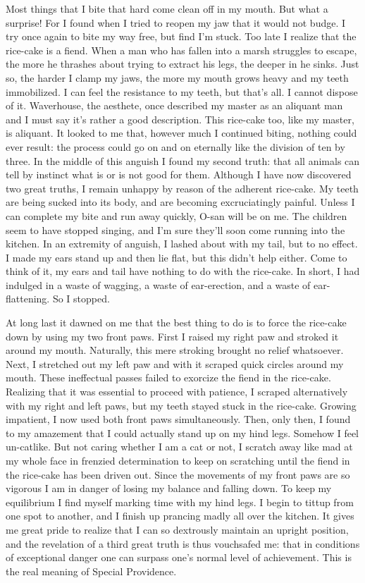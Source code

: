\documentclass{book}
\begin{document}
Most things that I bite that hard come clean off in my mouth. But what a
surprise! For I found when I tried to reopen my jaw that it would not
budge. I try once again to bite my way free, but find I'm stuck. Too
late I realize that the rice-cake is a fiend. When a man who has fallen
into a marsh struggles to escape, the more he thrashes about trying to
extract his legs, the deeper in he sinks. Just so, the harder I clamp my
jaws, the more my mouth grows heavy and my teeth immobilized. I can feel
the resistance to my teeth, but that's all. I cannot dispose of it.
Waverhouse, the aesthete, once described my master as an aliquant man
and I must say it's rather a good description. This rice-cake too, like
my master, is aliquant. It looked to me that, however much I continued
biting, nothing could ever result: the process could go on and on
eternally like the division of ten by three. In the middle of this
anguish I found my second truth: that all animals can tell by instinct
what is or is not good for them. Although I have now discovered two
great truths, I remain unhappy by reason of the adherent rice-cake. My
teeth are being sucked into its body, and are becoming excruciatingly
painful. Unless I can complete my bite and run away quickly, O-san will
be on me. The children seem to have stopped singing, and I'm sure
they'll soon come running into the kitchen. In an extremity of anguish,
I lashed about with my tail, but to no effect. I made my ears stand up
and then lie flat, but this didn't help either. Come to think of it, my
ears and tail have nothing to do with the rice-cake. In short, I had
indulged in a waste of wagging, a waste of ear-erection, and a waste of
ear-flattening. So I stopped.

At long last it dawned on me that the best thing to do is to force the
rice-cake down by using my two front paws. First I raised my right paw
and stroked it around my mouth. Naturally, this mere stroking brought no
relief whatsoever. Next, I stretched out my left paw and with it scraped
quick circles around my mouth. These ineffectual passes failed to
exorcize the fiend in the rice-cake. Realizing that it was essential to
proceed with patience, I scraped alternatively with my right and left
paws, but my teeth stayed stuck in the rice-cake. Growing impatient, I
now used both front paws simultaneously. Then, only then, I found to my
amazement that I could actually stand up on my hind legs. Somehow I feel
un-catlike. But not caring whether I am a cat or not, I scratch away
like mad at my whole face in frenzied determination to keep on
scratching until the fiend in the rice-cake has been driven out. Since
the movements of my front paws are so vigorous I am in danger of losing
my balance and falling down. To keep my equilibrium I find myself
marking time with my hind legs. I begin to tittup from one spot to
another, and I finish up prancing madly all over the kitchen. It gives
me great pride to realize that I can so dextrously maintain an upright
position, and the revelation of a third great truth is thus vouchsafed
me: that in conditions of exceptional danger one can surpass one's
normal level of achievement. This is the real meaning of Special
Providence.
\end{document}
